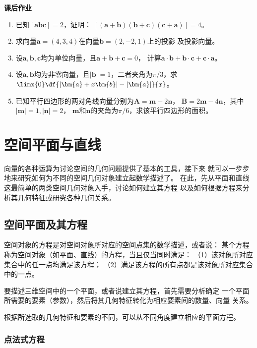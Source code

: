 \begin{ext}
	{\bf 课后作业}
	\begin{enumerate}
	  \item 已知$[\bm{abc}]=2$，证明：
	  $[(\bm{a}+\bm{b})(\bm{b}+\bm{c})(\bm{c}+\bm{a})]=4$。
	  \item 求向量$\bm{a}=(4,3,4)$在向量$\bm{b}=(2,-2,1)$上的投影
	  及投影向量。
	  \item 设$\bm{a},\bm{b},\bm{c}$均为单位向量，且$\bm{a}+\bm{b}+\bm{c}=0$，
	  计算$\bm{a}\cdot\bm{b}+\bm{b}\cdot\bm{c}+\bm{c}\cdot\bm{a}$。
	  \item 设$\bm{a},\bm{b}$均为非零向量，且$|\bm{b}|=1$，二者夹角为$\pi/3$，求
	  $\limx{0}\df{|\bm{a}+x\bm{b}|-|\bm{a}|}{x}$。
	  \item 已知平行四边形的两对角线向量分别为$\bm{A}=\bm{m}+2\bm{n}$，
	  $\bm{B}=2\bm{m}-4\bm{n}$，其中$|\bm{m}|=1,|\bm{n}|=2$，
	  $\bm{m}$和$\bm{n}$的夹角为$\pi/6$，求该平行四边形的面积。
	\end{enumerate}
\end{ext}

\section{空间平面与直线}

向量的各种运算为讨论空间的几何问题提供了基本的工具，接下来
就可以一步步地来研究如何为不同的空间几何对象建立起数学描述了。
在此，先从平面和直线这最简单的两类空间几何对象入手，讨论如何建立其方程
以及如何根据方程来分析其几何特征或研究各种几何关系。

\subsection{空间平面及其方程}

空间对象的方程是对空间对象所对应的空间点集的数学描述，或者说：
某个方程称为空间对象（如平面、直线）的方程，当且仅当同时满足：
（1）该对象所对应集合中的任一点均满足该方程；
（2）满足该方程的所有点都是该对象所对应集合中的一点。

要描述三维空间中的一个平面，或者说建立其方程，首先需要分析确定
一个平面所需要的要素（参数），然后将其几何特征转化为相应要素间的数量、向量
关系。

根据所选取的几何特征和要素的不同，可以从不同角度建立相应的平面方程。

\subsubsection{点法式方程}

